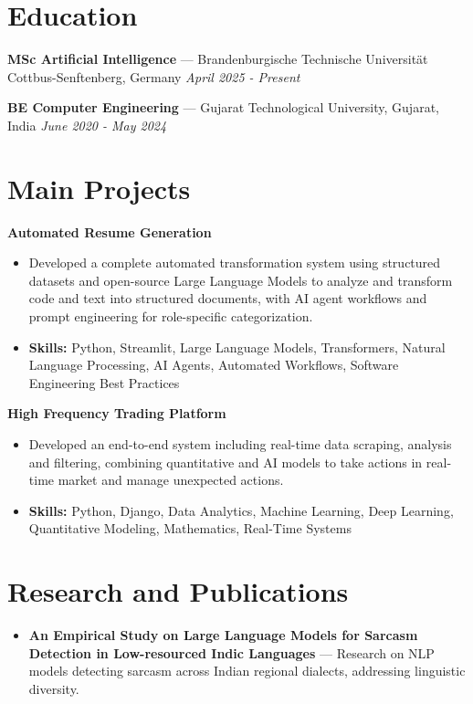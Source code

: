 \documentclass[a4paper,10pt]{article}
\begin{document}
\section*{Education}
\textbf{MSc Artificial Intelligence} — Brandenburgische Technische Universität Cottbus-Senftenberg, Germany \hfill \textit{April 2025 - Present}\par
\vspace{1.5pt}
\textbf{BE Computer Engineering} — Gujarat Technological University, Gujarat, India \hfill \textit{June 2020 - May 2024}\par

\section*{Main Projects}
\textbf{Automated Resume Generation}\par
\vspace{1pt}
\begin{itemize}
  \item Developed a complete automated transformation system using structured datasets and open-source Large Language Models to analyze and transform code and text into structured documents, with AI agent workflows and prompt engineering for role-specific categorization.
  \item \textbf{Skills:} Python, Streamlit, Large Language Models, Transformers, Natural Language Processing, AI Agents, Automated Workflows, Software Engineering Best Practices
\end{itemize}
\vspace{3pt}
\textbf{High Frequency Trading Platform}\par
\vspace{1pt}
\begin{itemize}
  \item Developed an end-to-end system including real-time data scraping, analysis and filtering, combining quantitative and AI models to take actions in real-time market and manage unexpected actions.
  \item \textbf{Skills:} Python, Django, Data Analytics, Machine Learning, Deep Learning, Quantitative Modeling, Mathematics, Real-Time Systems
\end{itemize}

\section*{Research and Publications}
\begin{itemize}
\item \textbf{An Empirical Study on Large Language Models for Sarcasm Detection in Low-resourced Indic Languages} — Research on NLP models detecting sarcasm across Indian regional dialects, addressing linguistic diversity.
\end{itemize}
\end{document}
